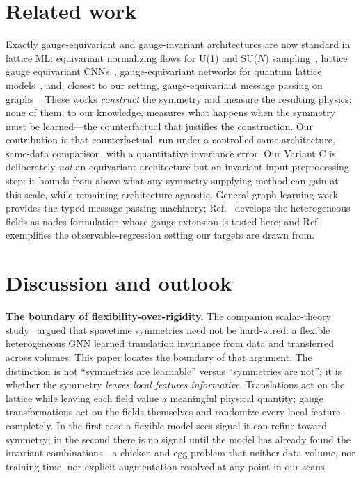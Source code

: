 \documentclass[aps,prd,twocolumn,superscriptaddress,nofootinbib]{revtex4-2}
\begin{document}
\section{Related work}
\label{sec:related}

Exactly gauge-equivariant and gauge-invariant architectures are now
standard in lattice ML: equivariant normalizing flows for U(1) and
SU($N$) sampling~\cite{Kanwar2020,Boyda2021}, lattice gauge equivariant
CNNs~\cite{Favoni2022}, gauge-equivariant networks for quantum lattice
models~\cite{Luo2021}, and, closest to our setting,
gauge-equivariant message passing on graphs~\cite{Rayat2026}. These
works \emph{construct} the symmetry and measure the resulting physics;
none of them, to our knowledge, measures what happens when the symmetry
must be learned---the counterfactual that justifies the construction.
Our contribution is that counterfactual, run under a controlled
same-architecture, same-data comparison, with a quantitative invariance
error. Our Variant C is deliberately \emph{not} an equivariant
architecture but an invariant-input preprocessing step: it bounds from
above what any symmetry-supplying method can gain at this scale, while
remaining architecture-agnostic. General graph learning
work~\cite{Battaglia2018,Schlichtkrull2018,Hu2020} provides the typed
message-passing machinery; Ref.~\cite{Brehm2026} develops the
heterogeneous fields-as-nodes formulation whose gauge extension is
tested here; and Ref.~\cite{Bachtis2021} exemplifies the
observable-regression setting our targets are drawn from.

\section{Discussion and outlook}
\label{sec:discussion}

\textbf{The boundary of flexibility-over-rigidity.} The companion
scalar-theory study~\cite{Brehm2026} argued that spacetime symmetries
need not be hard-wired: a flexible heterogeneous GNN learned translation
invariance from data and transferred across volumes. This paper locates
the boundary of that argument. The distinction is not
``symmetries are learnable'' versus ``symmetries are not''; it is
whether the symmetry \emph{leaves local features informative}.
Translations act on the lattice while leaving each field value a
meaningful physical quantity; gauge transformations act on the fields
themselves and randomize every local feature completely. In the first
case a flexible model sees signal it can refine toward symmetry; in the
second there is no signal until the model has already found the
invariant combinations---a chicken-and-egg problem that neither data
volume, nor training time, nor explicit augmentation resolved at any
point in our scans.
\end{document}
